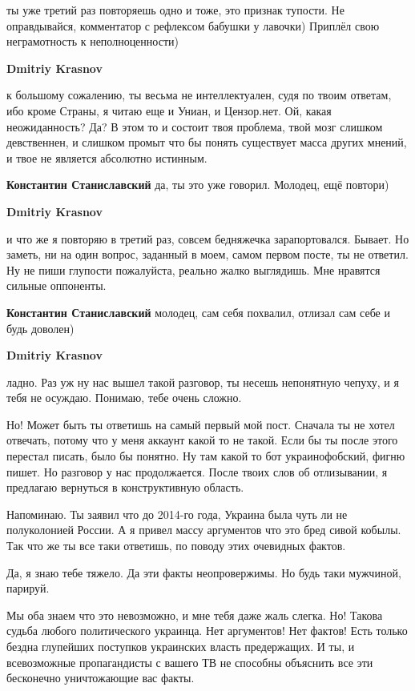 \begin{itemize}
\begin{itemize}
ты уже третий раз повторяешь одно и тоже, это признак тупости. Не оправдывайся,
комментатор с рефлексом бабушки у лавочки) Приплёл свою неграмотность к
неполноценности)

\textbf{Dmitriy Krasnov} 

к большому сожалению, ты весьма не интеллектуален, судя по твоим ответам, ибо
кроме Страны, я читаю еще и Униан, и Цензор.нет. Ой, какая неожиданность? Да? В
этом то и состоит твоя проблема, твой мозг слишком девственнен, и слишком
промыт что бы понять существует масса других мнений, и твое не является
абсолютно истинным.

\textbf{Константин Станиславский} да, ты это уже говорил. Молодец, ещё повтори)

\textbf{Dmitriy Krasnov} 

и что же я повторяю в третий раз, совсем бедняжечка зарапортовался. Бывает. Но
заметь, ни на один вопрос, заданный в моем, самом первом посте, ты не ответил.
Ну не пиши глупости пожалуйста, реально жалко выглядишь. Мне нравятся сильные
оппоненты.

\textbf{Константин Станиславский} молодец, сам себя похвалил, отлизал сам себе и будь доволен)

\textbf{Dmitriy Krasnov} 

ладно. Раз уж ну нас вышел такой разговор, ты несешь непонятную чепуху, и я
тебя не осуждаю. Понимаю, тебе очень сложно.

Но! Может быть ты ответишь на самый первый мой пост. Сначала ты не хотел
отвечать, потому что у меня аккаунт какой то не такой. Если бы ты после этого
перестал писать, было бы понятно. Ну там какой то бот украинофобский, фигню
пишет. Но разговор у нас продолжается. После твоих слов об отлизывании, я
предлагаю вернуться в конструктивную область.

Напоминаю. Ты заявил что до 2014-го года, Украина была чуть ли не полуколонией
России. А я привел массу аргументов что это бред сивой кобылы. Так что же ты
все таки ответишь, по поводу этих очевидных фактов.

Да, я знаю тебе тяжело. Да эти факты неопровержимы. Но будь таки мужчиной,
парируй.

Мы оба знаем что это невозможно, и мне тебя даже жаль слегка. Но! Такова судьба
любого политического украинца. Нет аргументов! Нет фактов! Есть только бездна
глупейших поступков украинских власть предержащих. И ты, и всевозможные
пропагандисты с вашего ТВ не способны объяснить все эти бесконечно уничтожающие
вас факты.



\end{itemize} %


\end{itemize} %
